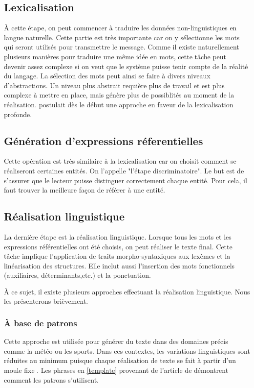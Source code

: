 \subsection{Lexicalisation}
À cette étape, on peut commencer à traduire les données non-linguistiques en langue naturelle. Cette partie est très importante car on y sélectionne les mots qui seront utilisés pour transmettre le message. Comme il existe naturellement plusieurs manières pour traduire une même idée en mots, cette tâche peut devenir assez complexe si on veut que le système puisse tenir compte de la réalité du langage. La sélection des mots peut ainsi se faire à divers niveaux d'abstractions. Un niveau plus abstrait requière plus de travail et est plus complexe à mettre en place, mais génère plus de possiblités au moment de la réalisation. \cite{ElhadadFloatingConstraintsLexical1997} postulait dès le début une approche en faveur de la lexicalisation profonde.

\subsection{Génération d'expressions réferentielles}
Cette opération est très similaire à la lexicalisation car on choisit comment se réaliseront certaines entités. On l'appelle "l'étape discriminatoire". Le but est de s'assurer que le lecteur puisse distinguer correctement chaque entité. Pour cela, il faut trouver la meilleure façon de référer à une entité.

\subsection{Réalisation linguistique}\label{real}
La dernière étape est la réalisation linguistique. Lorsque tous les mots et les expressions référentielles ont été choisis, on peut réaliser le texte final. Cette tâche implique l'application de traits morpho-syntaxiques aux lexèmes et la linéarisation des structures. Elle inclut aussi l'insertion des mots fonctionnels (auxiliaires, déterminants,etc.) et la ponctuation. 

À ce sujet, il existe plusieurs approches effectuant la réalisation linguistique. Nous les présenterons brièvement.

\subsubsection{À base de patrons}
Cette approche est utilisée pour générer du texte dans des domaines précis comme la météo ou les sports. Dans ces contextes, les variations linguistiques sont réduites au minimum puisque chaque réalisation de texte se fait à partir d'un moule fixe \citep{mcroy_channarukul_ali_2003}. Les phrases en \ref{template} provenant de l'article de \cite{gatt18} démontrent comment les patrons s'utilisent.

